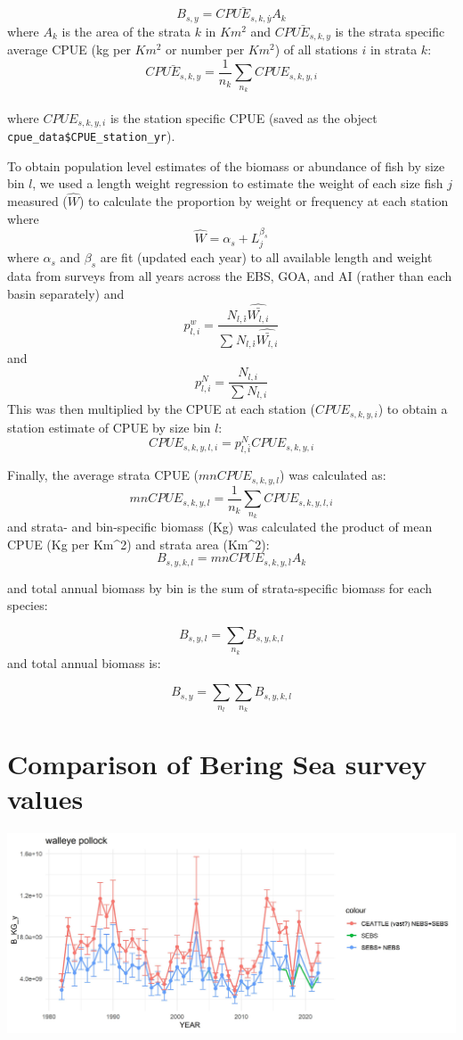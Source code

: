 \documentclass[
]{article}
\begin{document}
\[B_{s,y} =  \bar{CPUE_{s,k,y}} \dot{}A_{k}\] where \(A_{k}\) is the
area of the strata \(k\) in \(Km^2\) and \(\bar{CPUE_{s,k,y}}\) is the
strata specific average CPUE (kg per \(Km^2\) or number per \(Km^2\)) of
all stations \(i\) in strata \(k\):
\[\bar{CPUE_{s,k,y}} = \frac{1}{n_k}\dot{}\sum_{n_k}{CPUE_{s,k,y,i}}\]\\
where \(CPUE_{s,k,y,i}\) is the station specific CPUE (saved as the
object \texttt{cpue\_data\$CPUE\_station\_yr}).

To obtain population level estimates of the biomass or abundance of fish
by size bin \(l\), we used a length weight regression to estimate the
weight of each size fish \(j\) measured (\(\hat{W}\)) to calculate the
proportion by weight or frequency at each station where
\[\hat{W} = \alpha_s+L_j^{\beta_s} \] where \(\alpha_s\) and \(\beta_s\)
are fit (updated each year) to all available length and weight data from
surveys from all years across the EBS, GOA, and AI (rather than each
basin separately) and
\[p^w_{l,i} = \frac{N_{l,i}\dot{}\hat{\bar{W_{l,i}}}}{\sum_{}{N_{l,i}\dot{}\hat{\bar{W_{l,i}}}}}\]
and\\
\[p^N_{l,i} = \frac{N_{l,i}}{\sum_{}{N_{l,i}}}\] This was then
multiplied by the CPUE at each station (\(CPUE_{s,k,y,i}\)) to obtain a
station estimate of CPUE by size bin \(l\):
\[CPUE_{s,k,y,l,i} = p^N_{l,i}\dot{}CPUE_{s,k,y,i}\]

Finally, the average strata CPUE (\({mnCPUE_{s,k,y,l}}\)) was calculated
as:
\[{mnCPUE_{s,k,y,l}} = \frac{1}{n_k}\dot{}\sum_{n_k}{CPUE_{s,k,y,l,i}}\]
and strata- and bin-specific biomass (Kg) was calculated the product of
mean CPUE (Kg per Km\^{}2) and strata area (Km\^{}2):
\[B_{s,y,k,l}= {mnCPUE_{s,k,y,l}}\dot{}A_{k}\]

and total annual biomass by bin is the sum of strata-specific biomass
for each species:

\[B_{s,y,l}= \sum_{n_k}{B_{s,y,k,l}}\] and total annual biomass is:

\[B_{s,y}= \sum_{n_l}{\sum_{n_k}{B_{s,y,k,l}}}\]

\hypertarget{comparison-of-bering-sea-survey-values}{%
\section{Comparison of Bering Sea survey
values}\label{comparison-of-bering-sea-survey-values}}

\includegraphics{figs/plk_srvy.jpg}
\end{document}

